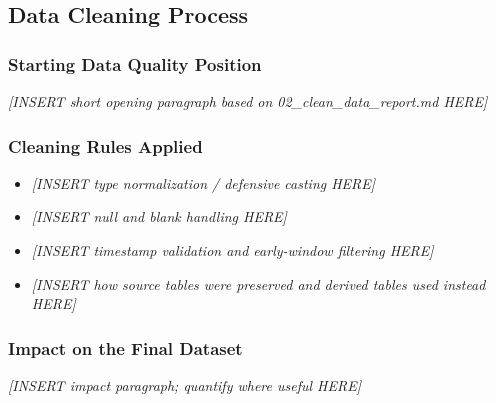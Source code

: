 \documentclass[12pt]{article}
\newcommand{\placeholder}[1]{\textit{[INSERT #1 HERE]}}
\begin{document}
\subsection{Data Cleaning Process}
\label{subsec:data_cleaning}

%
%

\subsubsection*{Starting Data Quality Position}
\placeholder{short opening paragraph based on 02\_clean\_data\_report.md}

\subsubsection*{Cleaning Rules Applied}
\begin{itemize}[leftmargin=1.5em]
    \item \placeholder{type normalization / defensive casting}
    \item \placeholder{null and blank handling}
    \item \placeholder{timestamp validation and early-window filtering}
    \item \placeholder{how source tables were preserved and derived tables used instead}
\end{itemize}

\subsubsection*{Impact on the Final Dataset}
\placeholder{impact paragraph; quantify where useful}
\end{document}
